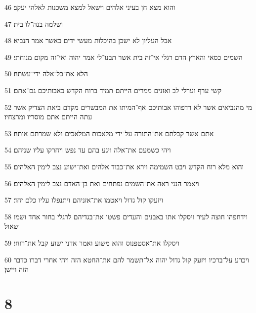 \par 46 והוא מצא חן בעיני אלהים וישאל למצא משכנות לאלהי יעקב׃
\par 47 ושלמה בנה־לו בית׃
\par 48 אבל העליון לא ישכן בהיכלות מעשי ידים כאשר אמר הנביא׃
\par 49 השמים כסאי והארץ הדם רגלי אי־זה בית אשר תבנו־לי אמר יהוה ואי־זה מקום מנוחתי׃
\par 50 הלא את־כל־אלה ידי־עשתה׃
\par 51 קשי ערף וערלי לב ואזנים ממרים הייתם תמיד ברוח הקדש כאבותיכם גם־אתם׃
\par 52 מי מהנביאים אשר לא רדפוהו אבותיכם אף־המיתו את המבשרים מקדם ביאת הצדיק אשר עתה הייתם אתם מוסריו ומרצחיו׃
\par 53 אתם אשר קבלתם את־התורה על־ידי מלאכות המלאכים ולא שמרתם אותה׃
\par 54 ויהי כשמעם את־אלה ויגע בהם עד נפש ויחרקו עליו שניהם׃
\par 55 והוא מלא רוח הקדש ויבט השמימה וירא את־כבוד אלהים ואת־ישוע נצב לימין האלהים׃
\par 56 ויאמר הנני ראה את־השמים נפתחים ואת בן־האדם נצב לימין האלהים׃
\par 57 ויזעקו קול גדול ויאטמו את־אזניהם ויתנפלו עליו כלם יחד׃
\par 58 וידחפהו חוצה לעיר ויסקלו אתו באבנים והעדים פשטו את־בגדיהם לרגלי בחור אחד ושמו שאול׃
\par 59 ויסקלו את־אסטפנוס והוא משוע ואמר אדני ישוע קבל את־רוחי׃
\par 60 ויכרע על־ברכיו ויזעק קול גדול יהוה אל־תשמר להם את־החטא הזה ויהי אחרי דברו כדבר הזה ויישן׃

\chapter{8}


